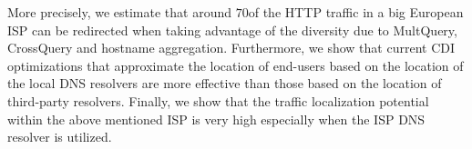 More precisely, we estimate that around $70$\perc of the HTTP traffic in a big
European ISP can be redirected when taking advantage of the diversity due to
MultQuery, CrossQuery and hostname aggregation.  Furthermore, we show that
current CDI optimizations that approximate the location of end-users based on
the location of the local DNS resolvers are more effective than those based on
the location of third-party resolvers. Finally, we show that the traffic
localization potential within the above mentioned ISP is very high especially
when the ISP DNS resolver is utilized.
